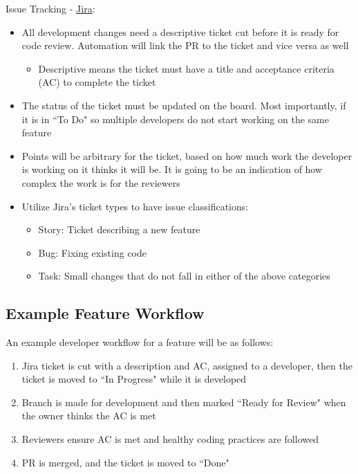 \documentclass{article}
\begin{document}
Issue Tracking - \href{https://flickpicker.atlassian.net/jira/software/projects/CAP/boards/1}{Jira}: 
\begin{itemize}
	\item All development changes need a descriptive ticket cut before it is ready for code review. Automation will link the PR to the ticket and vice versa as well
	\begin{itemize}
		\item Descriptive means the ticket must have a title and acceptance criteria (AC) to complete the ticket
	\end{itemize}
	\item The status of the ticket must be updated on the board. Most importantly, if it is in ``To Do" so multiple developers do not start working on the same feature
	\item Points will be arbitrary for the ticket, based on how much work the developer is working on it thinks it will be. It is going to be an indication of how complex the work is for the reviewers
	\item Utilize Jira's ticket types to have issue classifications:
	\begin{itemize}
		\item Story: Ticket describing a new feature
		\item Bug: Fixing existing code
		\item Task: Small changes that do not fall in either of the above categories
	\end{itemize}
\end{itemize}

\subsection{Example Feature Workflow}
An example developer workflow for a feature will be as follows:
\begin{enumerate}
	\item Jira ticket is cut with a description and AC, assigned to a developer, then the ticket is moved to ``In Progress" while it is developed
	\item Branch is made for development and then marked ``Ready for Review" when the owner thinks the AC is met
	\item Reviewers ensure AC is met and healthy coding practices are followed
	\item PR is merged, and the ticket is moved to ``Done"
\end{enumerate}
\end{document}
